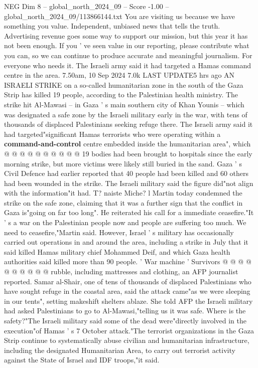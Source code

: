 \begin{textsample}{NEG Dim 8 – global\_north\_2024\_09 – Score -1.00 – global\_north\_2024\_09/113866144.txt}  \label{ex:f8_neg_370}
You are visiting us because we have something you value.
Independent, unbiased news that tells the truth.
Advertising revenue goes some way to support our mission, but this year it has not been enough.
If you ' ve seen value in our reporting, please contribute what you can, so we can continue to produce accurate and meaningful journalism.
For everyone who needs it.
The Israeli army said it had targeted a Hamas command centre in the area. 7.50am, 10 Sep 2024 7.0k LAST UPDATE5 hrs ago AN ISRAELI STRIKE on a so-called humanitarian zone in the south of the Gaza Strip has killed 19 people, according to the Palestinian health ministry.
The strike hit Al-Mawasi -- in Gaza ' s main southern city of Khan Younis -- which was designated a safe zone by the Israeli military early in the war, with tens of thousands of displaced Palestinians seeking refuge there.
The Israeli army said it had targeted"significant Hamas terrorists who were operating within a \textbf{command-and-control} centre embedded inside the humanitarian area", which @ @ @ @ @ @ @ @ @ @ 19 bodies had been brought to hospitals since the early morning strike, but more victims were likely still buried in the sand.
Gaza ' s Civil Defence had earlier reported that 40 people had been killed and 60 others had been wounded in the strike.
The Israeli military said the figure did"not align with the information"it had.
T? naiste Miche? l Martin today condemned the strike on the safe zone, claiming that it was a further sign that the conflict in Gaza is"going on far too long".
He reiterated his call for a immediate ceasefire."It ' s a war on the Palestinian people now and people are suffering too much.
We need to ceasefire,"Martin said.
However, Israel ' s military has occasionally carried out operations in and around the area, including a strike in July that it said killed Hamas military chief Mohammed Deif, and which Gaza health authorities said killed more than 90 people. ' War machine ' Survivors @ @ @ @ @ @ @ @ @ @ rubble, including mattresses and clothing, an AFP journalist reported.
Samar al-Shair, one of tens of thousands of displaced Palestinians who have sought refuge in the coastal area, said the attack came"as we were sleeping in our tents", setting makeshift shelters ablaze.
She told AFP the Israeli military had asked Palestinians to go to Al-Mawasi,"telling us it was safe.
Where is the safety?"The Israeli military said some of the dead were"directly involved in the execution"of Hamas ' s 7 October attack."The terrorist organizations in the Gaza Strip continue to systematically abuse civilian and humanitarian infrastructure, including the designated Humanitarian Area, to carry out terrorist activity against the State of Israel and IDF troops,"it said.

\end{textsample}
